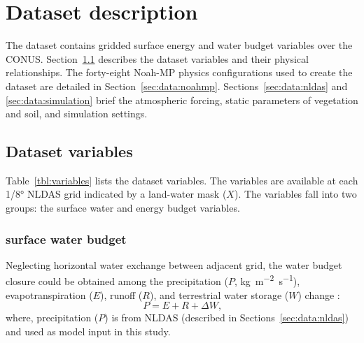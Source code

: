 \documentclass[essd]{copernicus}
\begin{document}
\section{Dataset description} \label{sec:data}

The dataset contains gridded surface energy and water budget variables over the CONUS. Section~\ref{sec:data:variables} describes the dataset variables and their physical relationships. The forty-eight Noah-MP physics configurations used to create the dataset are detailed in Section~\ref{sec:data:noahmp}.  Sections~\ref{sec:data:nldas} and \ref{sec:data:simulation} brief the atmospheric forcing, static parameters of vegetation and soil, and simulation
settings.


\subsection{Dataset variables} \label{sec:data:variables}

Table~\ref{tbl:variables} lists the dataset variables. The variables are available at each 1/8° NLDAS grid indicated by a land-water mask ($X$). The variables fall into two groups: the surface water and energy budget
variables.



\subsubsection{surface water budget}

Neglecting horizontal water exchange between adjacent grid, the water budget closure could be obtained among the precipitation ($P$, \unit{kg~m^{-2}~s^{-1}}), evapotranspiration ($E$), runoff ($R$), and terrestrial water storage ($W$) change \citep{zheng2020JAMES}:
\begin{equation}
    P = E + R + \Delta W \text{,}
\end{equation}
where, precipitation ($P$) is from NLDAS (described in Sections~\ref{sec:data:nldas}) and used as model input in this study.
\end{document}
